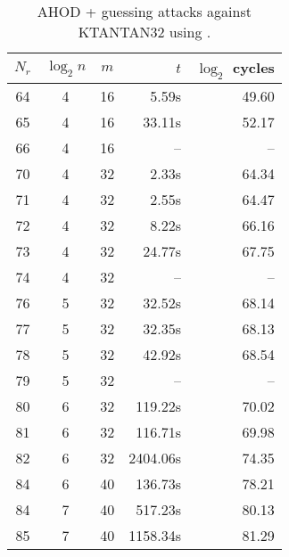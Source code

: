 \begin{table}[htbp]
\begin{center}
\begin{tabular}{|c|c|c|r|r|}
\hline
$N_r$ & $\log_2 n$ & $m$ & $t$ & $\log_2$ cycles\\
\hline
64 & 4 & 16 &  5.59s & 49.60\\
65 & 4 & 16 & 33.11s & 52.17\\
66 & 4 & 16 &     -- & --\\
\hline
70 & 4 & 32 &  2.33s & 64.34\\
71 & 4 & 32 &  2.55s & 64.47\\
72 & 4 & 32 &  8.22s & 66.16\\
73 & 4 & 32 & 24.77s & 67.75\\
74 & 4 & 32 &     -- & --\\
\hline
76 & 5 & 32 & 32.52s & 68.14\\
77 & 5 & 32 & 32.35s & 68.13\\
78 & 5 & 32 & 42.92s & 68.54\\
79 & 5 & 32 & -- & --\\
\hline
80 & 6 & 32 &  119.22s & 70.02\\
81 & 6 & 32 &  116.71s & 69.98\\
82 & 6 & 32 & 2404.06s & 74.35\\
\hline
84 & 6 & 40 &  136.73s & 78.21\\
\hline
84 & 7 & 40 &  517.23s & 80.13\\
85 & 7 & 40 & 1158.34s & 81.29\\
\hline
\end{tabular}
\end{center}
\caption{AHOD + guessing attacks against KTANTAN32 using \PolyBoRi.}
\label{tab:ahod-ktantan32-polybori-guess}
\end{table}

